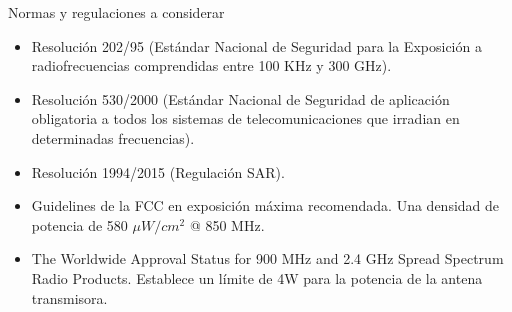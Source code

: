 Normas y regulaciones a considerar

\begin{itemize}
\item Resolución 202/95  (Estándar Nacional de Seguridad para la Exposición a radiofrecuencias comprendidas entre 100 KHz y 300 GHz).
\item Resolución 530/2000 (Estándar Nacional de Seguridad de aplicación obligatoria a todos los sistemas de telecomunicaciones que irradian en determinadas frecuencias).
\item Resolución 1994/2015 (Regulación SAR).
\item Guidelines de la FCC en exposición máxima recomendada. Una densidad de potencia de 580 $\mu W/{cm}^2$ @ 850 MHz.
\item The Worldwide Approval Status for 900 MHz and 2.4 GHz Spread Spectrum Radio Products. Establece un límite de 4W para la potencia de la antena transmisora.

\end{itemize}









